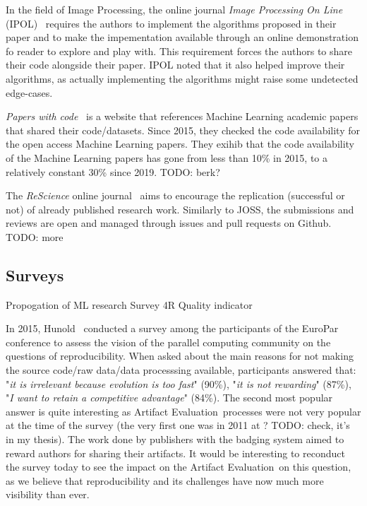 \documentclass[sigconf,natbib=false]{acmart}
\newcommand{\aeval}{Artifact Evaluation}
\newcommand{\todo}[1]{{\color{red}TODO: #1}}
\begin{document}
In the field of Image Processing, the online journal \emph{Image Processing On Line} (IPOL)\ \cite{colom2015ipol} requires the authors to implement the algorithms proposed in their paper and to make the impementation available through an online demonstration fo reader to explore and play with.
This requirement forces the authors to share their code alongside their paper.
IPOL noted that it also helped improve their algorithms, as actually implementing the algorithms might raise some undetected edge-cases.

\emph{Papers with code}\ \cite{paperswithcode} is a website that references Machine Learning academic papers that shared their code/datasets.
Since 2015, they checked the code availability for the open access Machine Learning papers.
They exihib that the code availability of the Machine Learning papers has gone from less than 10\% in 2015, to a relatively constant 30\% since 2019.
\todo{berk?}

The \emph{ReScience} online journal\ \cite{rougier2017sustainable, rougier2019rescience} aims to encourage the replication (successful or not) of already published research work.
Similarly to JOSS, the submissions and reviews are open and managed through issues and pull requests on Github.
\todo{more}

\subsection{Surveys}

Propogation of ML research  \cite{kang2023papers}
Survey 4R \cite{hernandez2023repeatability}
Quality indicator \cite{castell2024towards}

In 2015, Hunold\ \cite{hunold2015survey} conducted a survey among the participants of the EuroPar conference to assess the vision of the parallel computing community on the questions of reproducibility. 
When asked about the main reasons for not making the source code/raw data/data processsing available, participants answered that: "\emph{it is irrelevant because evolution is too fast}" (90\%), "\emph{it is not rewarding}" (87\%), "\emph{I want to retain a competitive advantage}" (84\%).
The second most popular answer is quite interesting as \aeval\ processes were not very popular at the time of the survey (the very first one was in 2011 at ? \todo{check, it's in my thesis}).
The work done by publishers with the badging system aimed to reward authors for sharing their artifacts.
It would be interesting to reconduct the survey today to see the impact on the \aeval\ on this question, as we believe that reproducibility and its challenges have now much more visibility than ever.
\end{document}

